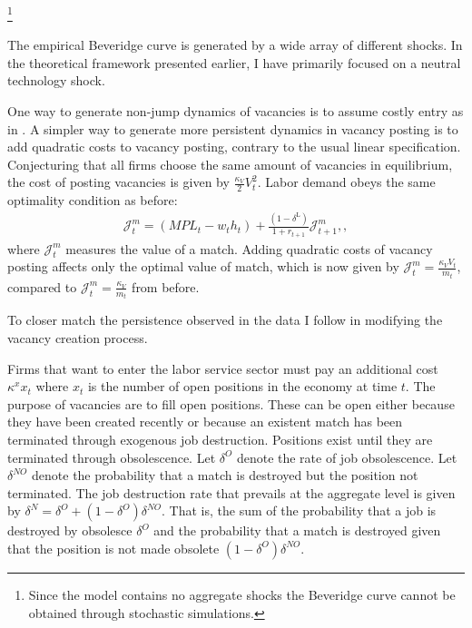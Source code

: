 \footnote{Since the model contains no aggregate shocks the Beveridge curve cannot be obtained through stochastic simulations. }

The empirical Beveridge curve is generated by a wide array of different shocks. In the theoretical framework presented earlier, I have primarily focused on a neutral technology shock.  


One way to generate non-jump dynamics of vacancies is to assume costly entry as in \citet{coles2018job}. A simpler way to generate more persistent dynamics in vacancy posting is to add quadratic costs to vacancy posting, contrary to the usual linear specification. Conjecturing that all firms choose the same amount of vacancies in equilibrium, the cost of posting vacancies is given by $\frac{\kappa_{V}}{2}V_{t}^{2}$. Labor demand obeys the same optimality condition as before:
\begin{gather*}
\mathcal{J}_{t}^{m}=\left(MPL_{t}-w_{t}h_{t}\right)+\frac{\left(1-\delta^{\text{L}}\right)}{1+r_{t+1}}\mathcal{J}_{t+1}^{m},,
\end{gather*}
where $\mathcal{J}_{t}^{m}$ measures the value of a match. Adding quadratic costs of vacancy posting affects only the optimal value of match, which is now given by $\mathcal{J}_{t}^{m}=\frac{\kappa_{V}V_{t}}{m_{t}}$, compared to $\mathcal{J}_{t}^{m}=\frac{\kappa_{V}}{m_{t}}$ from before.





To closer match the persistence observed in the data I follow \citet{fujita2007job} in modifying the vacancy creation process. 

Firms that want to enter the labor service sector must pay an additional cost $\kappa^{x}x_{t}$ where $x_t$ is the number of open positions in the economy at time $t$. The purpose of vacancies are to fill open positions. These can be open either because they have been created recently or because an existent match has been terminated through exogenous job destruction. Positions exist until they are terminated through obsolescence. 
Let $\delta^{O}$ denote the rate of job obsolescence. Let $\delta^{NO}$ denote the probability that a match is destroyed but the position not terminated. The job destruction rate that prevails at the aggregate level is given by $\delta^{N}=\delta^{O}+\left(1-\delta^{O}\right)\delta^{NO}$. That is, the sum of the probability that a job is destroyed by obsolesce $\delta^{O}$ and the probability that a match is destroyed given that the position is not made obsolete $\left(1-\delta^{O}\right)\delta^{NO}$. 

